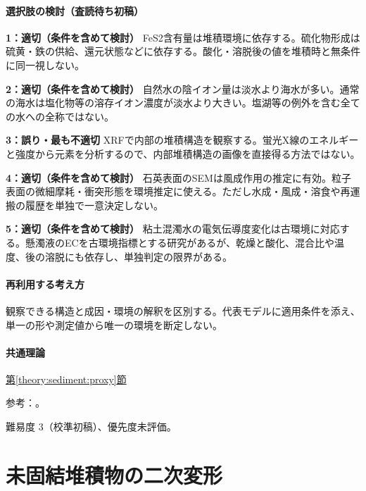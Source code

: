 \paragraph{選択肢の検討（査読待ち初稿）}\mbox{}\par

\noindent\textbf{1：適切（条件を含めて検討）} FeS2含有量は堆積環境に依存する。硫化物形成は硫黄・鉄の供給、還元状態などに依存する。酸化・溶脱後の値を堆積時と無条件に同一視しない。\par

\noindent\textbf{2：適切（条件を含めて検討）} 自然水の陰イオン量は淡水より海水が多い。通常の海水は塩化物等の溶存イオン濃度が淡水より大きい。塩湖等の例外を含む全ての水への全称ではない。\par

\noindent\textbf{3：誤り・最も不適切} XRFで内部の堆積構造を観察する。蛍光X線のエネルギーと強度から元素を分析するので、内部堆積構造の画像を直接得る方法ではない。\par

\noindent\textbf{4：適切（条件を含めて検討）} 石英表面のSEMは風成作用の推定に有効。粒子表面の微細摩耗・衝突形態を環境推定に使える。ただし水成・風成・溶食や再運搬の履歴を単独で一意決定しない。\par

\noindent\textbf{5：適切（条件を含めて検討）} 粘土混濁水の電気伝導度変化は古環境に対応する。懸濁液のECを古環境指標とする研究があるが、乾燥と酸化、混合比や温度、後の溶脱にも依存し、単独判定の限界がある。\par

\paragraph{再利用する考え方} 観察できる構造と成因・環境の解釈を区別する。代表モデルに適用条件を添え、単一の形や測定値から唯一の環境を断定しない。

\paragraph{共通理論} \hyperref[theory:sediment:proxy]{第\ref*{theory:sediment:proxy}節}

\par 参考：\cite{sed_xrf_jaea,sed_gsj_ec2011,sed_sem_shimane}。

\par 難易度 3（校準初稿）、優先度未評価。

\section{未固結堆積物の二次変形}

